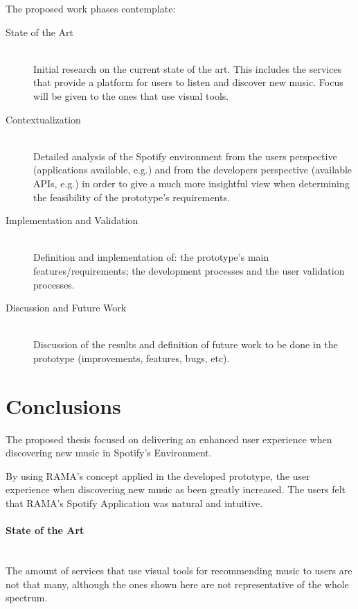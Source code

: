 \documentclass[twocolumn]{article}
\begin{document}
  The proposed work phases contemplate:

  \begin{description}
    \item[State of the Art] \hfill \\
      Initial research on the current state of the art. This includes the services that provide a platform for users to listen and discover new music. Focus will be given to the ones that use visual tools.
    \item[Contextualization] \hfill \\
      Detailed analysis of the Spotify environment from the users perspective (applications available, e.g.) and from the developers perspective (available APIs, e.g.) in order to give a much more insightful view when determining the feasibility of the prototype's requirements.
    \item[Implementation and Validation] \hfill \\
      Definition and implementation of: the prototype's main features/requirements; the development processes and the user validation processes.
    \item[Discussion and Future Work] \hfill \\
      Discussion of the results and definition of future work to be done in the prototype (improvements, features, bugs, etc).
  \end{description}

\section{Conclusions}
\label{sec:conclusions}

  The proposed thesis focused on delivering an enhanced user experience when discovering new music in Spotify's Environment.

  By using RAMA's concept applied in the developed prototype, the user experience when discovering new music as been greatly increased.
  The users felt that RAMA's Spotify Application was natural and intuitive.

  \paragraph*{State of the Art} \hfill \\
  \indent The amount of services that use visual tools for recommending music to users are not that many, although the ones shown here are not representative of the whole spectrum.
\end{document}
